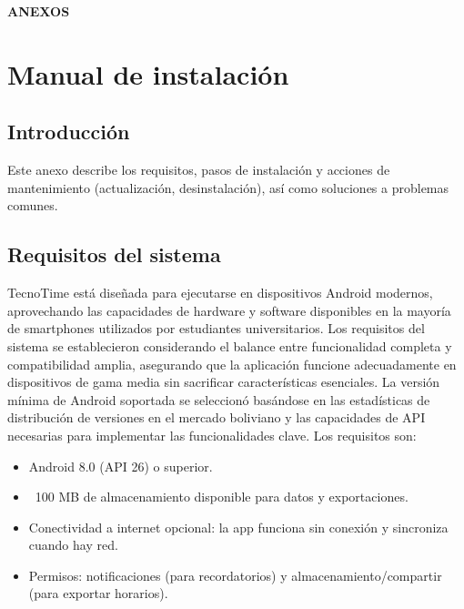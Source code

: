 
\clearpage
\thispagestyle{empty}
\vspace*{\fill}
\begin{center}
    \textbf{\fontsize{12}{14}\selectfont \MakeUppercase{Anexos}}
\end{center}
\vspace*{\fill}
\clearpage

\chapter{Manual de instalación}\label{ann:instalacion}
\section{Introducción}
Este anexo describe los requisitos, pasos de instalación y acciones de mantenimiento (actualización, desinstalación), así como soluciones a problemas comunes.
\section{Requisitos del sistema}
TecnoTime está diseñada para ejecutarse en dispositivos Android modernos, aprovechando las capacidades de hardware y software disponibles en la mayoría de smartphones utilizados por estudiantes universitarios. Los requisitos del sistema se establecieron considerando el balance entre funcionalidad completa y compatibilidad amplia, asegurando que la aplicación funcione adecuadamente en dispositivos de gama media sin sacrificar características esenciales. La versión mínima de Android soportada se seleccionó basándose en las estadísticas de distribución de versiones en el mercado boliviano y las capacidades de API necesarias para implementar las funcionalidades clave. Los requisitos son:

\begin{itemize}
  \item Android 8.0 (API 26) o superior.
  \item ~100 MB de almacenamiento disponible para datos y exportaciones.
  \item Conectividad a internet opcional: la app funciona sin conexión y sincroniza cuando hay red.
  \item Permisos: notificaciones (para recordatorios) y almacenamiento/compartir (para exportar horarios).
\end{itemize}

